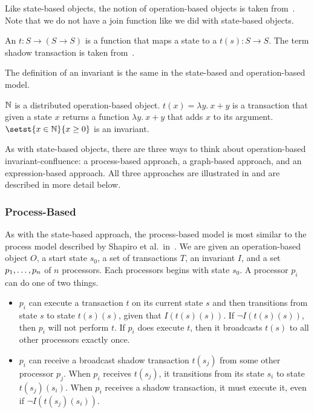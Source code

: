 Like state-based objects, the notion of operation-based objects is taken
from~\cite{shapiro2011conflict}. Note that we do not have a join function like
we did with state-based objects.

\begin{definition}
  An  $t: S \to (S \to S)$ is a function
  that maps a state to a  $t(s): S \to S$. The term
  shadow transaction is taken from~\cite{li2014automating}.
\end{definition}

The definition of an invariant is the same in the state-based and
operation-based model.

\begin{example}
  $\mathbb{N}$ is a distributed operation-based object. $t(x) = \lambda y.\ x + y$
  is a transaction that given a state $x$ returns a function $\lambda y.\ x +
  y$ that adds $x$ to its argument. $\setst{x \in \nats}{x \geq 0}$ is an
  invariant.
\end{example}

As with state-based objects, there are three ways to think about
operation-based invariant-confluence: a process-based approach, a graph-based
approach, and an expression-based approach. All three approaches are
illustrated in  and are described in more detail below.



\subsubsection{Process-Based}
As with the state-based approach, the process-based model is most similar to
the process model described by Shapiro et al.\ in~\cite{shapiro2011conflict}.
We are given an operation-based object $O$, a start state $s_0$, a set of
transactions $T$, an invariant $I$, and a set ${p}_{1}, \ldots, {p}_{n}$ of $n$
processors. Each processors begins with state $s_0$. A processor $p_i$ can do
one of two things.

\begin{itemize}
  \item
    $p_i$ can execute a transaction $t$ on its current state $s$ and then
    transitions from state $s$ to state $t(s)(s)$, given that $I(t(s)(s))$. If
    $\lnot I(t(s)(s))$, then $p_i$ will not perform $t$. If $p_i$ does execute
    $t$, then it broadcasts $t(s)$ to all other processors exactly once.

  \item
    $p_i$ can receive a broadcast shadow transaction $t(s_j)$ from some other
    processor $p_j$. When $p_i$ receives $t(s_j)$, it transitions from its
    state $s_i$ to state $t(s_j)(s_i)$. When $p_i$ receives a shadow
    transaction, it must execute it, even if $\lnot I(t(s_j)(s_i))$.
\end{itemize}


